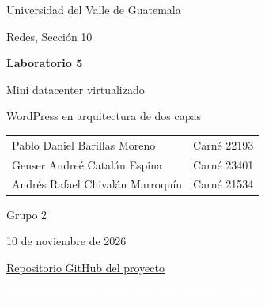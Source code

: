 \documentclass[11pt,a4paper]{article}
\begin{document}
\begin{titlepage}
  \pagecolor{softgreen}
  \color{darkgreen}
  \vspace*{1.3cm}
  {\Large Universidad del Valle de Guatemala\par}
  \vspace{0.4cm}
  {\large Redes, Sección 10\par}
  \vfill
  {\Huge\bfseries Laboratorio 5\par}
  \vspace{0.35cm}
  {\LARGE Mini datacenter virtualizado\par}
  \vspace{0.45cm}
  {\Large WordPress en arquitectura de dos capas\par}
  \vfill
  \begin{tabular}{ll}
    Pablo Daniel Barillas Moreno & Carné 22193 \\
    Genser Andreé Catalán Espina & Carné 23401 \\
    Andrés Rafael Chivalán Marroquín & Carné 21534 \\
  \end{tabular}
  \vfill
  {\large Grupo 2\par}
  \vspace{0.3cm}
  {\large 10 de noviembre de 2026\par}
  \vspace{0.35cm}
  {\normalsize
    \href{https://github.com/DanielBarillasM/Lab-5_escenario-de-mini-datacenter-virtualizado_Grupo-2_Redes_Sec-10}
    {Repositorio GitHub del proyecto}\par
  }
  \vspace{0.8cm}
  \colorbox{uvggreen}{\textcolor{white}{\bfseries Implementación verificada con evidencia real}}
  \vspace*{1cm}
\end{titlepage}
\nopagecolor
\color{black}

\tableofcontents
\clearpage
{}













\clearpage


\end{document}
